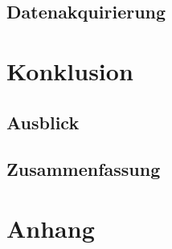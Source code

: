 \documentclass[medt,2017]{hitda}
\begin{document}
\section{Datenakquirierung}

\chapter{Konklusion}
\section{Ausblick}
\section{Zusammenfassung}

\printglossaries

\listoffigures

{}
\nosecauthor


\chapter{Anhang}
 
\end{document}
